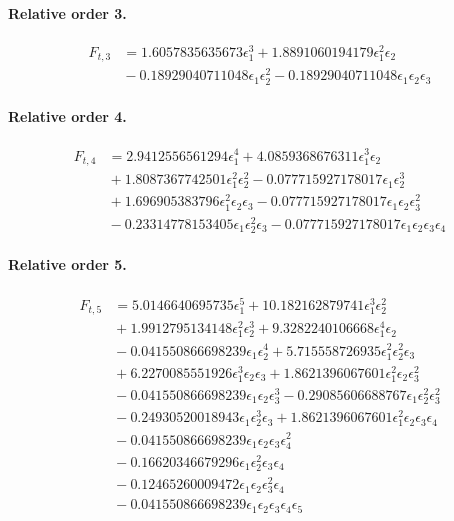\documentclass[10pt]{article}
\begin{document}
\paragraph{Relative order 3.}
\begin{align*}
F_{t,3} &= 1.6057835635673 \epsilon_{1}^{3} + 1.8891060194179 \epsilon_{1}^{2} \epsilon_{2} \\
&{}  - 0.18929040711048 \epsilon_{1} \epsilon_{2}^{2} - 0.18929040711048 \epsilon_{1} \epsilon_{2} \epsilon_{3}
\end{align*}

\paragraph{Relative order 4.}
\begin{align*}
F_{t,4} &= 2.9412556561294 \epsilon_{1}^{4} + 4.0859368676311 \epsilon_{1}^{3} \epsilon_{2} \\
&{}  + 1.8087367742501 \epsilon_{1}^{2} \epsilon_{2}^{2} - 0.077715927178017 \epsilon_{1} \epsilon_{2}^{3} \\
&{}  + 1.696905383796 \epsilon_{1}^{2} \epsilon_{2} \epsilon_{3} - 0.077715927178017 \epsilon_{1} \epsilon_{2} \epsilon_{3}^{2} \\
&{}  - 0.23314778153405 \epsilon_{1} \epsilon_{2}^{2} \epsilon_{3} - 0.077715927178017 \epsilon_{1} \epsilon_{2} \epsilon_{3} \epsilon_{4}
\end{align*}

\paragraph{Relative order 5.}
\begin{align*}
F_{t,5} &= 5.0146640695735 \epsilon_{1}^{5} + 10.182162879741 \epsilon_{1}^{3} \epsilon_{2}^{2} \\
&{}  + 1.9912795134148 \epsilon_{1}^{2} \epsilon_{2}^{3} + 9.3282240106668 \epsilon_{1}^{4} \epsilon_{2} \\
&{}  - 0.041550866698239 \epsilon_{1} \epsilon_{2}^{4} + 5.715558726935 \epsilon_{1}^{2} \epsilon_{2}^{2} \epsilon_{3} \\
&{}  + 6.2270085551926 \epsilon_{1}^{3} \epsilon_{2} \epsilon_{3} + 1.8621396067601 \epsilon_{1}^{2} \epsilon_{2} \epsilon_{3}^{2} \\
&{}  - 0.041550866698239 \epsilon_{1} \epsilon_{2} \epsilon_{3}^{3} - 0.29085606688767 \epsilon_{1} \epsilon_{2}^{2} \epsilon_{3}^{2} \\
&{}  - 0.24930520018943 \epsilon_{1} \epsilon_{2}^{3} \epsilon_{3} + 1.8621396067601 \epsilon_{1}^{2} \epsilon_{2} \epsilon_{3} \epsilon_{4} \\
&{}  - 0.041550866698239 \epsilon_{1} \epsilon_{2} \epsilon_{3} \epsilon_{4}^{2} \\
&{}  - 0.16620346679296 \epsilon_{1} \epsilon_{2}^{2} \epsilon_{3} \epsilon_{4} \\
&{}  - 0.12465260009472 \epsilon_{1} \epsilon_{2} \epsilon_{3}^{2} \epsilon_{4} \\
&{}  - 0.041550866698239 \epsilon_{1} \epsilon_{2} \epsilon_{3} \epsilon_{4} \epsilon_{5}
\end{align*}
\end{document}
